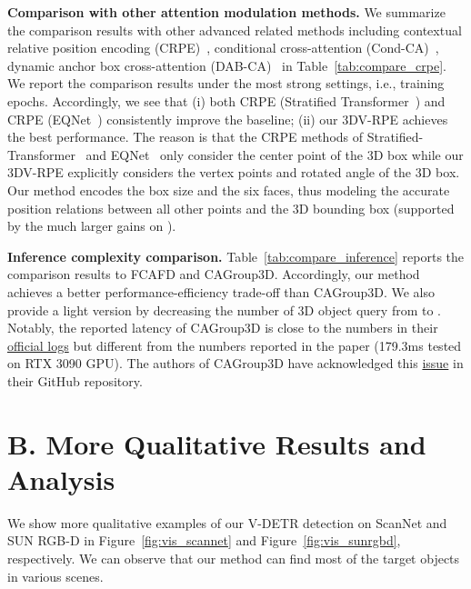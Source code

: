 \documentclass[10pt,twocolumn,letterpaper]{article}
\begin{document}
\vspace{1mm}
\noindent \textbf{Comparison with other attention modulation methods.}
We summarize the comparison results with other advanced related methods including contextual relative position encoding (CRPE)~\cite{lai2022stratified,yang2022unified}, conditional cross-attention (Cond-CA)~\cite{meng2021CondDETR}, dynamic anchor box cross-attention (DAB-CA)~\cite{liu2022dab} in Table~\ref{tab:compare_crpe}.
We report the comparison results under the most strong settings, i.e.,  training epochs.
Accordingly, we see that (i) both CRPE (Stratified Transformer~\cite{lai2022stratified}) and CRPE (EQNet~\cite{yang2022unified}) consistently improve the baseline; (ii) our 3DV-RPE achieves the best performance.
The reason is that the CRPE methods of Stratified-Transformer~\cite{lai2022stratified} and EQNet~\cite{yang2022unified} only consider the center point of the 3D box while our 3DV-RPE explicitly considers the  vertex points and rotated angle of the 3D box. Our method encodes the box size and the six faces, thus modeling the accurate position relations between all other points and the 3D bounding box (supported by the much larger gains on ).


\vspace{1mm}
\noindent \textbf{Inference complexity comparison.}
Table~\ref{tab:compare_inference} reports the comparison results to FCAFD and CAGroup3D. Accordingly, our method achieves a better performance-efficiency trade-off than CAGroup3D.
We also provide a light version by decreasing the number of 3D object query from  to .
Notably, the reported latency of CAGroup3D is close to the numbers in their \href{https://github.com/Haiyang-W/CAGroup3D#main-results}{official logs} but different from the numbers reported in the paper (179.3ms tested on RTX 3090 GPU). The authors of CAGroup3D have acknowledged this \href{https://github.com/Haiyang-W/CAGroup3D#todo}{issue} in their GitHub repository.



\section*{B. More Qualitative Results and Analysis}

We show more qualitative examples of our V-DETR detection on ScanNet and SUN RGB-D in Figure~\ref{fig:vis_scannet} and Figure~\ref{fig:vis_sunrgbd}, respectively.
We can observe that our method can find most of the target objects in various scenes.
\end{document}
